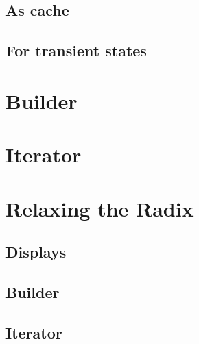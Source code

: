 \subsection{As cache}





\subsection{For transient states}


\section{Builder}




\section{Iterator}



\section{Relaxing the Radix}


\subsection{Displays}




\subsection{Builder}



\subsection{Iterator}

